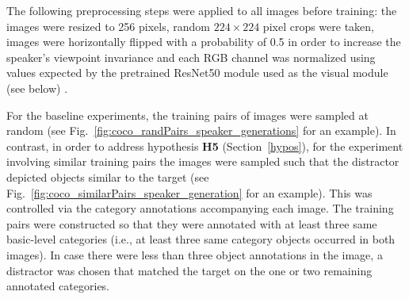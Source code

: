 The following preprocessing steps were applied to all images before training: the images were resized to 256 pixels, random $224\times224$ pixel crops were taken, images were horizontally flipped with a probability of 0.5 in order to increase the speaker's viewpoint invariance and each RGB channel was normalized using values expected by the pretrained ResNet50 module used as the visual module (see below) \parencite{he2016deep}.

For the baseline experiments, the training pairs of images were sampled at random (see Fig.~\ref{fig:coco_randPairs_speaker_generations} for an example). In contrast, in order to address hypothesis \textbf{H5} (Section~\ref{hypos}), for the experiment involving similar training pairs the images were sampled such that the distractor depicted objects similar to the target (see Fig.~\ref{fig:coco_similarPairs_speaker_generation} for an example). This was controlled via the category annotations accompanying each image. 
The training pairs were constructed so that they were annotated with at least three same basic-level categories (i.e., at least three same category objects occurred in both images). In case there were less than three object annotations in the image, a distractor was chosen that matched the target on the one or two remaining annotated categories. 

